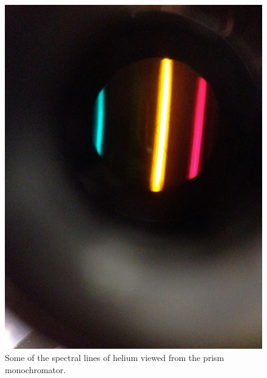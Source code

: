 \documentclass[11pt,letterpaper]{article}
\begin{document}

{}

\newpage

\begin{figure}
    \centering
    \includegraphics[width=\textwidth]{figures/IMG_1309.jpg}
    \caption{Some of the spectral lines of helium viewed from the prism
    monochromator.}
\end{figure}
\end{document}
